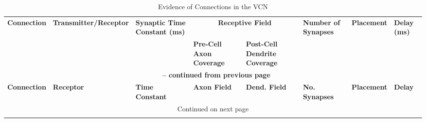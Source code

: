 \begin{longtable}{XXXXXXXX}%
%
\caption{Evidence of Connections in the VCN}\label{tab:Connections} \\
\toprule  {\textbf{Connection}} & {\textbf{Transmitter\slash Receptor}} & {\textbf{Synaptic Time Constant (ms)}} & \multicolumn{2}{c}{\textbf{Receptive Field}} & {\textbf{Number of Synapses}} & {\textbf{Placement}} & {\textbf{Delay (ms)}}\\
&&& {\textbf{Pre-Cell Axon Coverage}} & {\textbf{Post-Cell Dendrite Coverage}} &&& \\ \midrule 
\endfirsthead

\multicolumn{8}{c}{{\bfseries \tablename\ \thetable{} -- continued from previous page}} \\
\hline {\textbf{Connection}} & {\textbf{Receptor}} & {\textbf{Time Constant}} & {\textbf{Axon Field}}& {\textbf{Dend. Field}} & {\textbf{No. Synapses}} & {\textbf{Placement}} & {\textbf{Delay}} \\ \midrule 
\endhead

\midrule \multicolumn{8}{c}{{Continued on next page}} \\ %
\endfoot
\bottomrule
\endlastfoot


\end{longtable}
